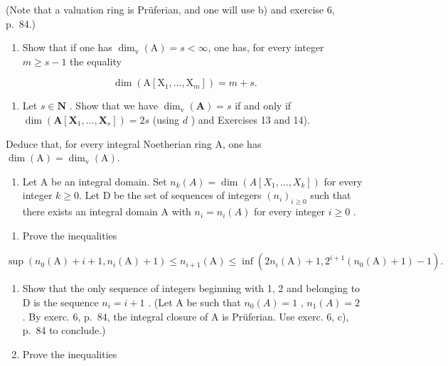 (Note that a valuation ring is Prüferian, and one will use b) and exercise 6, p.~84.)

\begin{enumerate}
\def\labelenumi{\alph{enumi})}
\setcounter{enumi}{3}
\tightlist
\item
  Show that if one has \(\dim_{\mathrm v}(\mathrm A) = s < \infty\), one has, for every integer \(m \geqslant s - 1\) the equality
\end{enumerate}

\[
\dim (\mathrm{A} [ \mathrm{X} _ {1},..., \mathrm{X} _ {m} ]) = m + s.
\]

\begin{enumerate}
\def\labelenumi{\alph{enumi})}
\setcounter{enumi}{4}
\tightlist
\item
  Let \(s \in \mathbf{N}\) . Show that we have \(\dim_{\mathrm{v}}(\mathbf{A}) = s\) if and only if \(\dim(\mathbf{A}[\mathbf{X}_1, ..., \mathbf{X}_s]) = 2s\) (using \(d\) ) and Exercises 13 and 14).
\end{enumerate}

Deduce that, for every integral Noetherian ring A, one has \(\dim(\mathrm{A}) = \dim_{\mathrm{v}}(\mathrm{A})\).

\begin{enumerate}
\def\labelenumi{\arabic{enumi})}
\setcounter{enumi}{16}
\tightlist
\item
  Let A be an integral domain. Set \(n_k(A) = \dim(A[X_1, ..., X_k])\) for every integer \(k \geqslant 0\). Let D be the set of sequences of integers \((n_i)_{i \geqslant 0}\) such that there exists an integral domain A with \(n_i = n_i(A)\) for every integer \(i \geqslant 0\) .
\end{enumerate}

\begin{enumerate}
\def\labelenumi{\alph{enumi})}
\tightlist
\item
  Prove the inequalities
\end{enumerate}

\[
\sup \left(n _ {0} (\mathrm{A}) + i + 1, n _ {i} (\mathrm{A}) + 1\right) \leqslant n _ {i + 1} (\mathrm{A}) \leqslant \inf \left(2 n _ {i} (\mathrm{A}) + 1, 2 ^ {i + 1} \left(n _ {0} (\mathrm{A}) + 1\right) - 1\right).
\]

\begin{enumerate}
\def\labelenumi{\alph{enumi})}
\setcounter{enumi}{1}
\tightlist
\item
  Show that the only sequence of integers beginning with 1, 2 and belonging to D is the sequence \(n_{i}=i+1\) . (Let A be such that \(n_{0}(A)=1\) , \(n_{1}(A)=2\) . By exerc. 6, p.~84, the integral closure of A is Prüferian. Use exerc. 6, c), p.~84 to conclude.)\\
\item
  Prove the inequalities
\end{enumerate}

